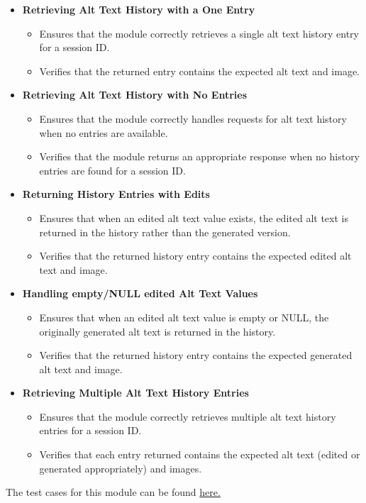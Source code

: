 \documentclass[12pt, titlepage]{article}
\begin{document}
\begin{itemize}
  \item \textbf{Retrieving Alt Text History with a One Entry}
  \begin{itemize}
    \item Ensures that the module correctly retrieves a single alt text history entry for a session ID.
    \item Verifies that the returned entry contains the expected alt text and image.
  \end{itemize}

  \item \textbf{Retrieving Alt Text History with No Entries}
  \begin{itemize}
    \item Ensures that the module correctly handles requests for alt text history when no entries are available.
    \item Verifies that the module returns an appropriate response when no history entries are found for a session ID.
  \end{itemize}

  \item \textbf{Returning History Entries with Edits}
  \begin{itemize}
    \item Ensures that when an edited alt text value exists, the edited alt text is returned in the history rather than the generated version.
    \item Verifies that the returned history entry contains the expected edited alt text and image.
  \end{itemize}

  \item \textbf{Handling empty/NULL edited Alt Text Values}
  \begin{itemize}
    \item Ensures that when an edited alt text value is empty or NULL, the originally generated alt text is returned in the history.
    \item Verifies that the returned history entry contains the expected generated alt text and image.
  \end{itemize}

  \item \textbf{Retrieving Multiple Alt Text History Entries}
  \begin{itemize} 
    \item Ensures that the module correctly retrieves multiple alt text history entries for a session ID.
    \item Verifies that each entry returned contains the expected alt text (edited or generated appropriately) and images.
  \end{itemize}
\end{itemize}
The test cases for this module can be found \href{https://github.com/4G06-CAPSTONE-2025/Reading4All/blob/main/backend/tests/test_alt_text_history.py}{here.}
\end{document}
